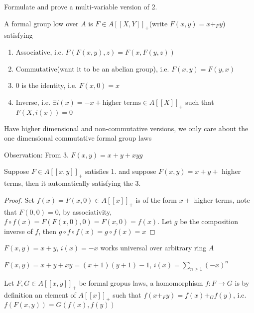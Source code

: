 \documentclass[main]{subfiles}
\begin{document}
\begin{exercise}
Formulate and prove a multi-variable version of 2.
\end{exercise}

\begin{definition}
A formal group low over $A$ is $F\in A[[X,Y]]_+$(write $F(x,y)=x+_Fy$) satisfying
\begin{enumerate}
\item Associative, i.e. $F(F(x,y),z)=F(x,F(y,z))$
\item Commutative(want it to be an abelian group), i.e. $F(x,y)=F(y,x)$
\item 0 is the identity, i.e. $F(x,0)=x$
\item Inverse, i.e. $\exists i(x)=-x+\text{higher terms}\in A[[X]]_+$ such that $F(X,i(x))=0$
\end{enumerate}
\end{definition}

\begin{remark}
Have higher dimensional and non-commutative versions, we only care about the one dimensional commutative formal group laws
\end{remark}

Observation: From 3. $F(x,y)=x+y+xyg$

\begin{lemma}
Suppose $F\in A[[x,y]]_+$ satisfies 1. and suppose $F(x,y)=x+y+$ higher terms, then it automatically satisfying the 3.
\end{lemma}

\begin{proof}
Set $f(x)=F(x,0)\in A[[x]]_+$ is of the form $x+$ higher terms, note that $F(0,0)=0$, by associativity, $f\circ f(x)=F(F(x,0),0)=F(x,0)=f(x)$. Let $g$ be the composition inverse of $f$, then $g\circ f\circ f(x)=g\circ f(x)=x$
\end{proof}

\begin{example}
$F(x,y)=x+y$, $i(x)=-x$ works universal over arbitrary ring $A$
\end{example}

\begin{example}
$F(x,y)=x+y+xy=(x+1)(y+1)-1$, $i(x)=\sum_{n\geq1}(-x)^n$
\end{example}

\begin{definition}
Let $F,G\in A[[x,y]]_+$ be formal gropus laws, a homomorphism $f:F\to G$ is by definition an element of $A[[x]]_+$ such that $f(x+_Fy)=f(x)+_Gf(y)$, i.e. $f(F(x,y))=G(f(x),f(y))$
\end{definition}
\end{document}
